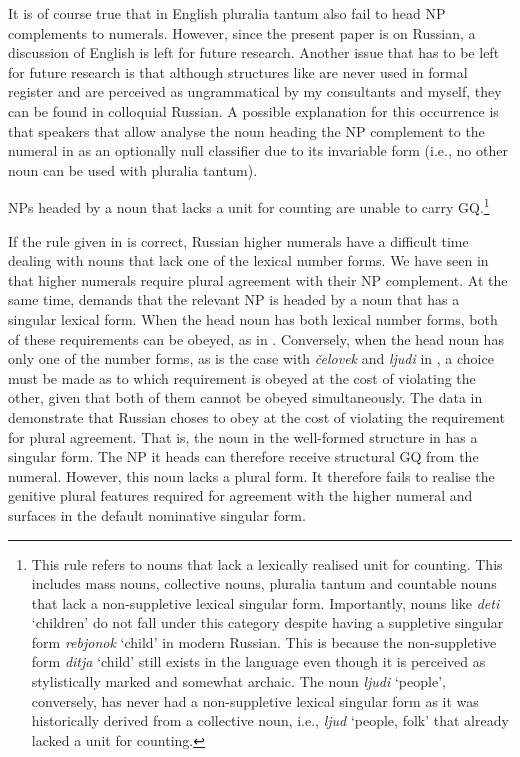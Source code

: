 \documentclass[output=paper,
modfonts,
newtxmath,
hidelinks
]{langscibook}
\begin{document}
{\begin{multicols}{2}
\end{multicols}

\noindent It is of course true that in English pluralia tantum also fail to head NP complements to numerals. However, since the present paper is on Russian, a discussion of English is left for future research. Another issue that has to be left for future research is that although structures like  are never used in formal register and are perceived as ungrammatical by my consultants and myself, they can be found in colloquial Russian. A possible explanation for this occurrence is that speakers that allow  analyse the noun heading the NP complement to the numeral in  as an optionally null classifier due to its invariable form (i.e., no other noun can be used with pluralia tantum).}

\ea \label{ex8} NPs headed by a noun that lacks a unit for counting are unable to carry GQ.\label{ex:key:8}\footnote{\label{fn5}This rule refers to nouns that lack a lexically realised unit for counting. This includes mass nouns, collective nouns, pluralia tantum and countable nouns that lack a non-suppletive lexical singular form. Importantly, nouns like \textit{deti} ‘children’ do not fall under this category despite having a suppletive singular form \textit{rebjonok} ‘child’ in modern Russian. This is because the non-suppletive form \textit{ditja} ‘child’ still exists in the language even though it is perceived as stylistically marked and somewhat archaic.  The noun \textit{ljudi} ‘people’, conversely, has never had a non-suppletive lexical singular form as it was historically derived from a collective noun, i.e., \textit{ljud} ‘people, folk’ \citep{Chumakina-etal2004} that already lacked a unit for counting.
}

    \z

\noindent If the rule given in  is correct, Russian higher numerals have a difficult time dealing with nouns that lack one of the lexical number forms. We have seen in  that higher numerals require plural agreement with their NP complement. At the same time,  demands that the relevant NP is headed by a noun that has a singular lexical form. When the head noun has both lexical number forms, both of these requirements can be obeyed, as in . Conversely, when the head noun has only one of the number forms, as is the case with \textit{čelovek} and \textit{ljudi} in , a choice must be made as to which requirement is obeyed at the cost of violating the other, given that both of them cannot be obeyed simultaneously. The data in  demonstrate that Russian choses to obey  at the cost of violating the requirement for plural agreement. That is, the noun in the well-formed structure in  has a singular form. The NP it heads can therefore receive structural GQ from the numeral. However, this noun lacks a plural form. It therefore fails to realise the genitive plural features required for agreement with the higher numeral and surfaces in the default nominative singular form.
\end{document}
